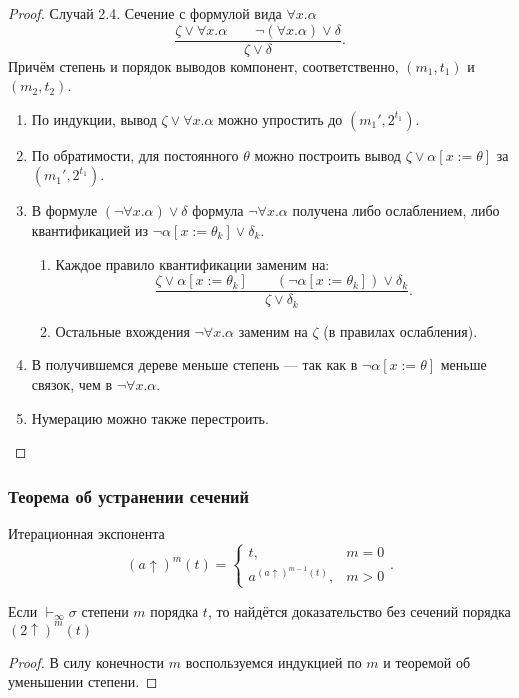 \begin{proof}
{Случай 2.4. Сечение с формулой вида $\forall x.\alpha$}
\[ \dfrac{\zeta\vee\forall x.\alpha\quad\quad\neg(\forall x.\alpha)\vee\delta}{\zeta\vee\delta}.\]
Причём степень и порядок выводов компонент, соответственно, $(m_1,t_1)$ и $(m_2,t_2)$.
\begin{enumerate}
\item По индукции, вывод $\zeta\vee\forall x.\alpha$ можно упростить до $(m_1',2^{t_1})$.
\item По обратимости, для постоянного $\theta$ можно построить вывод $\zeta\vee\alpha[x := \theta]$ за $(m_1',2^{t_1})$.
\item В формуле $(\neg \forall x. \alpha)\vee\delta$ формула $\neg\forall x.\alpha$ получена
либо ослаблением, либо квантификацией из $\neg\alpha[x := \theta_k]\vee\delta_k$.
\begin{enumerate}
\item Каждое правило квантификации заменим на:
\[ \dfrac{\zeta\vee\alpha[x := \theta_k]\quad\quad(\neg\alpha[x := \theta_k])\vee\delta_k}{\zeta\vee\delta_k}.\]
\item Остальные вхождения $\neg\forall x.\alpha$ заменим на $\zeta$ (в правилах ослабления).
\end{enumerate}
\item В получившемся дереве меньше степень --- так как в $\neg\alpha[x := \theta]$ меньше связок, чем в $\neg\forall x.\alpha$.
\item Нумерацию можно также перестроить.
\end{enumerate}
\end{proof}


\subsubsection{Теорема об устранении сечений}
\begin{definition}
  Итерационная экспонента
\[ (a\uparrow)^m(t) =
  \left\{
    \begin{array}{ll}     t,&m=0\\
 a^{(a\uparrow)^{m-1}(t)},&m > 0
    \end{array}
  \right. .\]
\end{definition}
\begin{theorem}Если $\vdash_\infty\sigma$ степени $m$ порядка $t$, то найдётся доказательство без сечений
порядка $(2\uparrow)^m(t)$
\end{theorem}
\begin{proof}
В силу конечности $m$ воспользуемся индукцией по $m$ и теоремой об уменьшении степени.
\end{proof}


